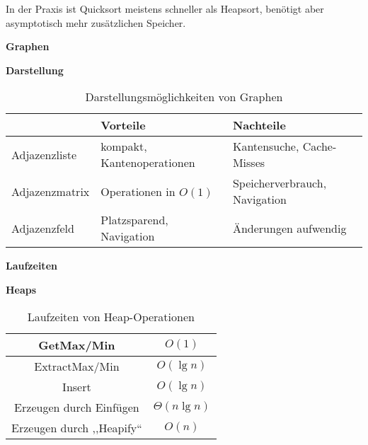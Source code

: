 \documentclass{letter}
\newcommand{\section}[1]{\medskip\bigskip

\noindent\textbf{\LARGE #1}}
\newcommand{\subsection}[1]{\medskip\bigskip

\noindent\textbf{\Large #1}}
\newcommand{\subsubsection}[1]{\medskip\bigskip

\noindent\textbf{\large #1}}
\begin{document}
In der Praxis ist Quicksort meistens schneller als Heapsort, ben\"otigt aber
asymptotisch mehr zus\"atzlichen Speicher.

\subsection{Graphen}

\subsubsection{Darstellung}

\begin{table}[h]
  \begin{tabular}{|l|l|l|}
    \hline
    & Vorteile & Nachteile\\
    \hline
    Adjazenzliste & kompakt, Kantenoperationen & Kantensuche, Cache-Misses\\
    \hline
    Adjazenzmatrix & Operationen in $O \left( 1 \right)$ & Speicherverbrauch,
    Navigation\\
    \hline
    Adjazenzfeld & Platzsparend, Navigation & \"Anderungen aufwendig\\
    \hline
  \end{tabular}
  \caption{Darstellungsm\"oglichkeiten von Graphen}
\end{table}

\section{Laufzeiten}

\subsection{Heaps}

\begin{table}[h]
  \begin{tabular}{|c|c|}
    \hline
    GetMax/Min & $O \left( 1 \right)$\\
    \hline
    ExtractMax/Min & $O \left( \lg n \right)$\\
    \hline
    Insert & $O \left( \lg n \right)$\\
    \hline
    Erzeugen durch Einf\"ugen & $\Theta \left( n \lg n \right)$\\
    \hline
    Erzeugen durch ,,Heapify`` & $O \left( n \right)$\\
    \hline
  \end{tabular}
  \caption{Laufzeiten von Heap-Operationen}
\end{table}
\end{document}
